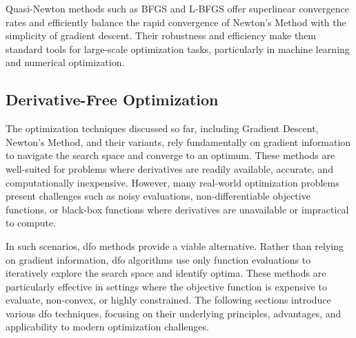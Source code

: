 Quasi-Newton methods such as BFGS and L-BFGS offer superlinear convergence rates and efficiently balance the rapid convergence of Newton's Method with the simplicity of gradient descent. Their robustness and efficiency make them standard tools for large-scale optimization tasks, particularly in machine learning and numerical optimization.









\subsection{Derivative-Free Optimization}
\label{subsection:derivative_free_optimization}
The optimization techniques discussed so far, including Gradient Descent, Newton's Method, and their variants, rely fundamentally on gradient information to navigate the search space and converge to an optimum. These methods are well-suited for problems where derivatives are readily available, accurate, and computationally inexpensive. However, many real-world optimization problems present challenges such as noisy evaluations, non-differentiable objective functions, or black-box functions where derivatives are unavailable or impractical to compute.  

In such scenarios, \ac{dfo}  methods provide a viable alternative. Rather than relying on gradient information, \ac{dfo} algorithms use only function evaluations to iteratively explore the search space and identify optima. These methods are particularly effective in settings where the objective function is expensive to evaluate, non-convex, or highly constrained. The following sections introduce various \ac{dfo} techniques, focusing on their underlying principles, advantages, and applicability to modern optimization challenges.

